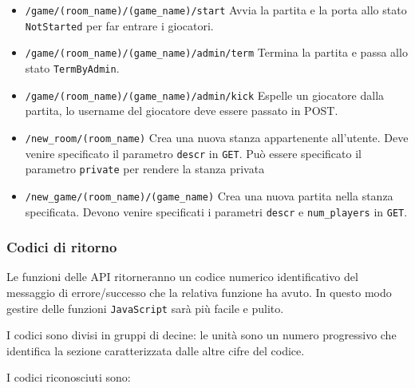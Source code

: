 \documentclass[10pt,a4paper]{article}
\newcommand{\pageurl}[1]{\small\texttt{#1}}
\newcommand{\GET}{\texttt{GET}}
\begin{document}
\begin{itemize}
\item \pageurl{/game/(room\_name)/(game\_name)/start} Avvia la partita e la porta allo stato \texttt{NotStarted} per far entrare i giocatori.

\item \pageurl{/game/(room\_name)/(game\_name)/admin/term} Termina la partita e passa allo stato \texttt{TermByAdmin}.

\item \pageurl{/game/(room\_name)/(game\_name)/admin/kick} Espelle un giocatore dalla partita, lo username del giocatore deve essere passato in POST.

\item \pageurl{/new\_room/(room\_name)} Crea una nuova stanza appartenente all'utente. Deve venire specificato il parametro \texttt{descr} in \GET. Può essere specificato il parametro \texttt{private} per rendere la stanza privata

\item \pageurl{/new\_game/(room\_name)/(game\_name)} Crea una nuova partita nella stanza specificata. Devono venire specificati i parametri \texttt{descr} e \texttt{num\_players} in \GET.
\end{itemize}

\subsubsection{Codici di ritorno}
Le funzioni delle API ritorneranno un codice numerico identificativo del messaggio di errore/successo che la relativa funzione ha avuto. In questo modo gestire delle funzioni \texttt{JavaScript} sarà più facile e pulito. 

I codici sono divisi in gruppi di decine: le unità sono un numero progressivo che identifica la sezione caratterizzata dalle altre cifre del codice.

I codici riconosciuti sono:
\end{document}
